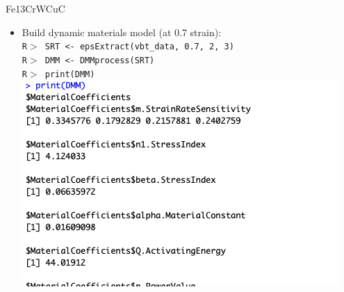 \documentclass[11pt]{beamer}
\newcommand{\code}[1]{\texttt{#1}}
\begin{document}
\begin{frame}[t]{Fe{\color{red}13Cr}WCuC}
	\begin{minipage}[t]{1\textwidth}
        \vspace{0pt}
        \begin{itemize}
            \item {\small Build dynamic materials model (at 0.7 strain):\\
            {\scriptsize\code{R$>$ SRT <- epsExtract(vbt\_data, {\color{red}0.7}, 2, 3)\\
            R$>$ DMM <- DMMprocess(SRT)\\
            R$>$ print(DMM)
            }}
            }\\
            \includegraphics[scale=0.4]{Fig7.png}
        \end{itemize}
    \end{minipage}%
\end{frame}
\end{document}
